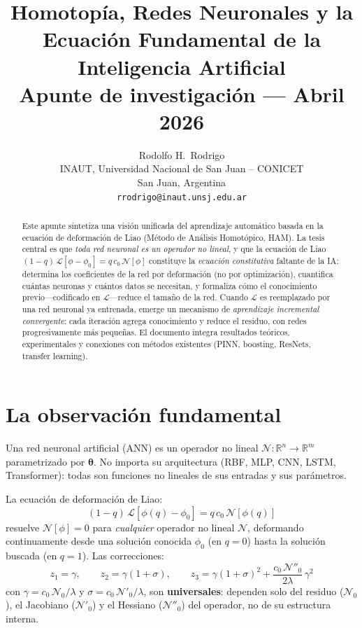 \documentclass[11pt,a4paper]{article}
\title{\textbf{Homotop\'ia, Redes Neuronales y la\\Ecuaci\'on Fundamental de la Inteligencia Artificial}\\[12pt]
\large Apunte de investigaci\'on --- Abril 2026}
\author{Rodolfo H.\ Rodrigo\\
\small INAUT, Universidad Nacional de San Juan -- CONICET\\
\small San Juan, Argentina\\
\small \texttt{rrodrigo@inaut.unsj.edu.ar}}
\date{}
\begin{document}
\maketitle
\thispagestyle{fancy}

\begin{abstract}
Este apunte sintetiza una visi\'on unificada del aprendizaje autom\'atico basada en la ecuaci\'on de deformaci\'on de Liao (M\'etodo de An\'alisis Homot\'opico, HAM). La tesis central es que \emph{toda red neuronal es un operador no lineal}, y que la ecuaci\'on de Liao $(1-q)\,\mathcal{L}[\phi - \phi_0] = q\,c_0\,\mathcal{N}[\phi]$ constituye la \emph{ecuaci\'on constitutiva} faltante de la IA: determina los coeficientes de la red por deformaci\'on (no por optimizaci\'on), cuantifica cu\'antas neuronas y cu\'antos datos se necesitan, y formaliza c\'omo el conocimiento previo---codificado en $\mathcal{L}$---reduce el tama\~no de la red. Cuando $\mathcal{L}$ es reemplazado por una red neuronal ya entrenada, emerge un mecanismo de \emph{aprendizaje incremental convergente}: cada iteraci\'on agrega conocimiento y reduce el residuo, con redes progresivamente m\'as peque\~nas. El documento integra resultados te\'oricos, experimentales y conexiones con m\'etodos existentes (PINN, boosting, ResNets, transfer learning).
\end{abstract}

\tableofcontents
\newpage

\section{La observaci\'on fundamental}

\begin{clave}
Una red neuronal artificial (ANN) es un operador no lineal $\mathcal{N}: \mathbb{R}^n \to \mathbb{R}^m$ parametrizado por $\boldsymbol{\theta}$. No importa su arquitectura (RBF, MLP, CNN, LSTM, Transformer): todas son funciones no lineales de sus entradas y sus par\'ametros.
\end{clave}

La ecuaci\'on de deformaci\'on de Liao:
\begin{equation}
\boxed{(1-q)\,\mathcal{L}[\phi(q) - \phi_0] = q\,c_0\,\mathcal{N}[\phi(q)]}
\label{eq:liao}
\end{equation}
resuelve $\mathcal{N}[\phi] = 0$ para \emph{cualquier} operador no lineal $\mathcal{N}$, deformando continuamente desde una soluci\'on conocida $\phi_0$ (en $q=0$) hasta la soluci\'on buscada (en $q=1$). Las correcciones:
\begin{equation}
z_1 = \gamma, \qquad z_2 = \gamma(1+\sigma), \qquad z_3 = \gamma(1+\sigma)^2 + \frac{c_0\,\mathcal{N}''_0}{2\lambda}\,\gamma^2
\label{eq:z123}
\end{equation}
con $\gamma = c_0\,\mathcal{N}_0/\lambda$ y $\sigma = c_0\,\mathcal{N}'_0/\lambda$, son \textbf{universales}: dependen solo del residuo ($\mathcal{N}_0$), el Jacobiano ($\mathcal{N}'_0$) y el Hessiano ($\mathcal{N}''_0$) del operador, no de su estructura interna.
\end{document}
